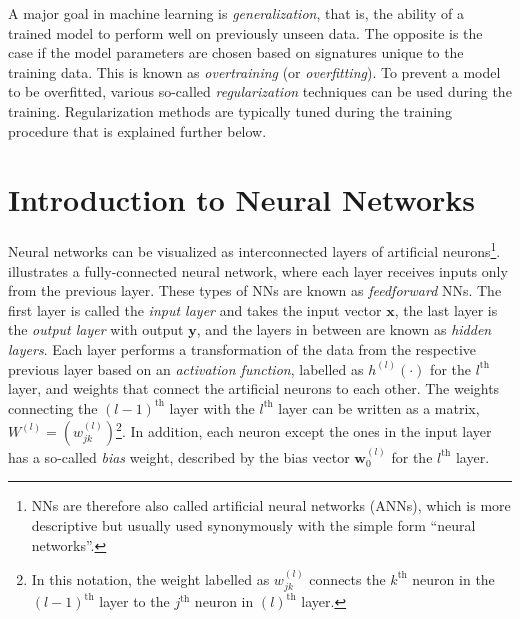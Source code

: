 A major goal in machine learning is \emph{generalization}, that is, the ability of a trained model to perform well on previously unseen data.
The opposite is the case if the model parameters are chosen based on signatures unique to the training data. This is known as \emph{overtraining} (or \emph{overfitting}). To prevent a model to be overfitted, various so-called \emph{regularization} techniques can be used during the training.
Regularization methods are typically tuned during the training procedure that is explained further below.


\section{Introduction to Neural Networks}
\label{sec:intro-neural-nets}
Neural networks can be visualized as interconnected layers of artificial neurons\footnote{NNs are therefore also called artificial neural networks (ANNs), which is more descriptive but usually used synonymously with the simple form ``neural networks''.}.  illustrates a fully-connected neural network, where each layer receives inputs only from the previous layer. These types of NNs are known as \emph{feedforward} NNs.
The first layer is called the \emph{input layer} and takes the input vector $\pmb{x}$, the last layer is the \emph{output layer} with output $\pmb{y}$, and the layers in between are known as \emph{hidden layers}. 
Each layer performs a transformation of the data from the respective previous layer based on an \emph{activation function}, labelled as $h^{(l)}(\cdot)$ for the $l^\text{th}$ layer, and weights that connect the artificial neurons to each other. The weights connecting the $(l-1)^{\text{th}}$ layer with the $l^{\text{th}}$ layer can be written as a matrix, $W^{(l)} = \left(w^{(l)}_{jk} \right)$\footnote{In this notation, the weight labelled as $w^{(l)}_{jk}$ connects the $k^\text{th}$ neuron in the $(l-1)^\text{th}$ layer to the $j^\text{th}$ neuron in $(l)^\text{th}$ layer.}. In addition, each neuron except the ones in the input layer has a so-called \emph{bias} weight, described by the bias vector $\pmb{w}^{(l)}_0$ for the $l^\text{th}$ layer.
